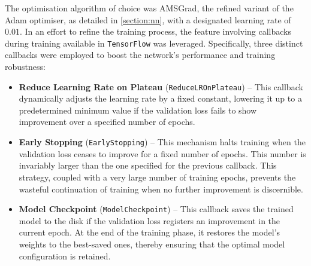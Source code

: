 The optimisation algorithm of choice was AMSGrad, the refined variant of the Adam optimiser, as detailed in \autoref{section:nn}, with a designated learning rate of $0.01$. In an effort to refine the training process, the feature involving callbacks during training available in \texttt{TensorFlow} was leveraged. Specifically, three distinct callbacks were employed to boost the network's performance and training robustness:
\begin{itemize}[leftmargin=1.5em]
    \setlength\itemsep{0.2cm}

    \item \textbf{Reduce Learning Rate on Plateau} (\texttt{ReduceLROnPlateau}) -- This callback dynamically adjusts the learning rate by a fixed constant, lowering it up to a predetermined minimum value if the validation loss fails to show improvement over a specified number of epochs.

    \item \textbf{Early Stopping} (\texttt{EarlyStopping}) -- This mechanism halts training when the validation loss ceases to improve for a fixed number of epochs. This number is invariably larger than the one specified for the previous callback. This strategy, coupled with a very large number of training epochs, prevents the wasteful continuation of training when no further improvement is discernible.

    \item \textbf{Model Checkpoint} (\texttt{ModelCheckpoint}) -- This callback saves the trained model to the disk if the validation loss registers an improvement in the current epoch. At the end of the training phase, it restores the model's weights to the best-saved ones, thereby ensuring that the optimal model configuration is retained.
\end{itemize}

